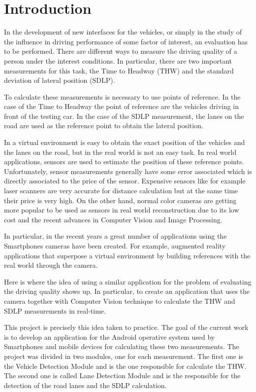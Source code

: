 \chapter{Introduction} \label{cha:introduction}

In the development of new interfaces for the vehicles, or simply in the study of 
the influence in driving performance of some factor of interest, an evaluation
has to be performed. There are different ways to measure the driving quality of
a person under the interest conditions. In particular, there are two important
measurements for this task, the Time to Headway (THW) and the standard deviation
of lateral position (SDLP).

To calculate these measurements is necessary to use points of reference. In the
case of the Time to Headway the point of reference are the vehicles driving in
front of the testing car. In the case of the SDLP measurement, the lanes on the
road are used as the reference point to obtain the lateral position.

In a virtual environment is easy to obtain the exact position of the vehicles
and the lanes on the road, but in the real world is not an easy task. In real
world applications, sensors are used to estimate the position of these reference
points. Unfortunately, sensor measurements generally have some error associated
which is directly associated to the price of the sensor. Expensive sensors like
for example laser scanners are very accurate for distance calculation but at the
same time their price is very high. On the other hand, normal color cameras are
getting more popular to be used as sensors in real world reconstruction due to
its low cost and the recent advances in Computer Vision and Image Processing.

In particular, in the recent years a great number of applications using the
Smartphones cameras have been created. For example, augmented reality
applications that superpose a virtual environment by building references with
the real world through the camera.

Here is where the idea of using a similar application for the problem of
evaluating the driving quality shows up. In particular, to create an application
that uses the camera together with Computer Vision technique to calculate the
THW and SDLP measurements in real-time.

This project is precisely this idea taken to practice. The goal of the current
work is to develop an application
for the Android operative system used by Smartphones and mobile devices for
calculating these two measurements. The project was divided in two modules, one
for each measurement. The first one is the Vehicle Detection Module and is the
one responsible for calculate the THW. The second one is called Lane Detection
Module and is the responsible for the detection of the road lanes and the SDLP
calculation.
